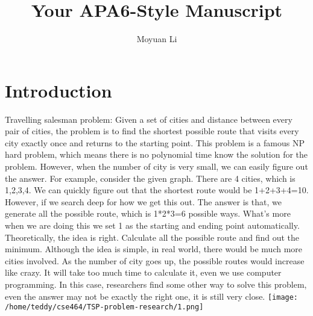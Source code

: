 \documentclass[a4paper,man,natbib]{apa6}
\title{Your APA6-Style Manuscript}
\author{Moyuan Li}
\affiliation{Miami Oxford}
\begin{document}
\maketitle

\section{Introduction}
Travelling salesman problem: Given a set of cities and distance between every pair of cities, the problem is to find the shortest possible route that visits every city exactly once and returns to the starting point. This problem is a famous NP hard problem, which means there is no polynomial time know the solution for the problem. However, when the number of city is very small, we can easily figure out the answer. For example, consider the given graph. There are 4 cities, which is 1,2,3,4. We can quickly figure out that the shortest route would be 1+2+3+4=10. However, if we search deep for how we get this out. The answer is that, we generate all the possible route, which is 1*2*3=6 possible ways. What’s more when we are doing this we set 1 as the starting and ending point automatically. Theoretically, the idea is right. Calculate all the possible route and find out the minimum. Although the idea is simple, in real world, there would be much more cities involved. As the number of city goes up, the possible routes would increase like crazy. It will take too much time to calculate it, even we use computer programming. In this case, researchers find some other way to solve this problem, even the answer may not be exactly the right one, it is still very close. 
\texttt{[image: /home/teddy/cse464/TSP-problem-research/1.png]}
\end{document}

